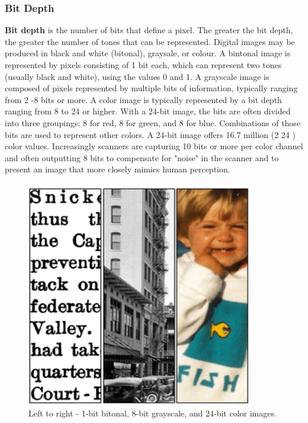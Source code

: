 \documentclass[10pt]{article}
\begin{document}
\begin{multicols}{2}
\subsubsection{Bit Depth}
\textbf{Bit depth} is the number of bits that define a pixel. The greater the bit depth, the greater the number of tones that can be represented. Digital images may be produced in black and white (bitonal), graysale, or colour.
\newline \newline
A bintonal image is represented by pixels consisting of 1 bit each, which can represent two tones (usually black and white), using the values 0 and 1.
\newline \newline
A grayscale image is composed of pixels represented by multiple bits of information, typically ranging from 2 -8 bits or more.
\newline \newline
A color image is typically represented by a bit depth ranging from 8 to 24 or higher. With a 24-bit image, the bits are often divided into three groupings: 8 for red, 8 for green, and 8 for blue. Combinations of those bits are used to represent other colors. A 24-bit image offers 16.7 million (2 24 ) color values. Increasingly scanners are capturing 10 bits or more per color channel and often outputting 8 bits to compensate for "noise" in the scanner and to present an image that more closely mimics human perception.
\begin{figure}[H]
    \centering
    \includegraphics[width=0.7\linewidth]{Images/Week 3/bitdepth.png}
    \caption{Left to right - 1-bit bitonal, 8-bit grayscale, and 24-bit color images.}

\end{figure}
\end{multicols}
\end{document}
